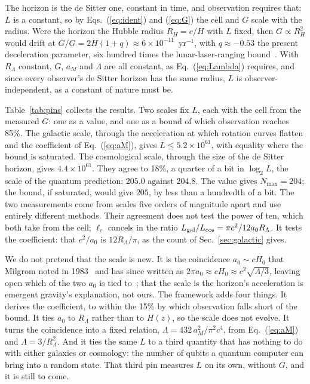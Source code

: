 \documentclass[aps,prd,twocolumn,superscriptaddress,nofootinbib,showkeys]{revtex4-2}
\makeatletter
\newcommand{\lc}{\ell_c}
\newcommand{\RL}{R_\Lambda}
\def\section{\@startsection{section}{1}{\z@}{0.6cm \@plus1ex \@minus .2ex}{0.35cm}{\normalfont\small\bfseries}}
\makeatother
\begin{document}
The horizon is the de Sitter one, constant in time, and observation requires that: $L$ is a constant, so by Eqs.~(\ref{eq:ident}) and (\ref{eq:G}) the cell and $G$ scale with the radius. Were the horizon the Hubble radius $R_H = c/H$ with $L$ fixed, then $G\propto R_H^2$ would drift at $\dot G/G = 2H(1+q)\approx6\times10^{-11}$~yr$^{-1}$, with $q\approx-0.53$ the present deceleration parameter, six hundred times the lunar-laser-ranging bound~\cite{hofmann2018}. With $\RL$ constant, $G$, $a_M$ and $\Lambda$ are all constant, as Eq.~(\ref{eq:Lambda}) requires, and since every observer's de Sitter horizon has the same radius, $L$ is observer-independent, as a constant of nature must be.

\section{Does $L$ Hold?}
\label{sec:hold}

Table~\ref{tab:pins} collects the results. Two scales fix $L$, each with the cell from the measured $G$: one as a value, and one as a bound of which observation reaches 85\%. The galactic scale, through the acceleration at which rotation curves flatten and the coefficient of Eq.~(\ref{eq:aM}), gives $L \le 5.2\times10^{61}$, with equality where the bound is saturated. The cosmological scale, through the size of the de Sitter horizon, gives $4.4\times10^{61}$. They agree to 18\%, a quarter of a bit in $\log_2 L$, the scale of the quantum prediction: $205.0$ against $204.8$. The value gives $N_{\max} = 204$; the bound, if saturated, would give $205$, by less than a hundredth of a bit. The two measurements come from scales five orders of magnitude apart and use entirely different methods. Their agreement does not test the power of ten, which both take from the cell; $\lc$ cancels in the ratio $L_{\rm gal}/L_{\rm cos} = \pi c^2/12 a_0\RL$. It tests the coefficient: that $c^2/a_0$ is $12\RL/\pi$, as the count of Sec.~\ref{sec:galactic} gives.

We do not pretend that the scale is new. It is the coincidence $a_0\sim cH_0$ that Milgrom noted in 1983~\cite{milgrom1983} and has since written as $2\pi a_0\approx cH_0\approx c^2\sqrt{\Lambda/3}$, leaving open which of the two $a_0$ is tied to~\cite{milgrom2020}; that the scale is the horizon's acceleration is emergent gravity's explanation, not ours. The framework adds four things. It derives the coefficient, to within the 15\% by which observation falls short of the bound. It ties $a_0$ to $\RL$ rather than to $H(z)$, so the scale does not evolve. It turns the coincidence into a fixed relation, $\Lambda = 432\,a_M^2/\pi^2c^4$, from Eq.~(\ref{eq:aM}) and $\Lambda = 3/\RL^2$. And it ties the same $L$ to a third quantity that has nothing to do with either galaxies or cosmology: the number of qubits a quantum computer can bring into a random state. That third pin measures $L$ on its own, without $G$, and it is still to come.
\end{document}
